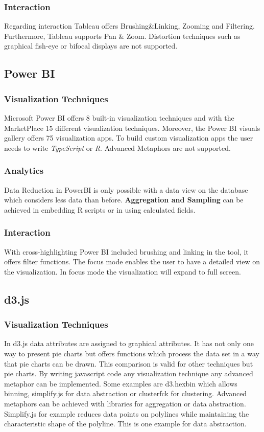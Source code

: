 \subsubsection*{Interaction}
Regarding interaction Tableau offers Brushing&Linking, Zooming and Filtering. Furthermore, Tableau supports Pan & Zoom. 
Distortion techniques such as graphical fish-eye or bifocal displays are not supported. 

\subsection*{Power BI}

\subsubsection*{Visualization Techniques}
Microsoft Power BI offers 8 built-in visualization techniques and with the MarketPlace 15 different visualization techniques. Moreover, the Power BI visuals gallery offers 75 visualization apps. To build custom visualization apps the user needs to write \textit{TypeScript} or \textit{R}. Advanced Metaphors are not supported. 

\subsubsection*{Analytics}
Data Reduction in PowerBI is only possible with a data view on the database which considers less data than before. 
\textbf{Aggregation and Sampling} can be achieved in embedding R scripts or in using calculated fields.
\subsubsection*{Interaction}
With cross-highlighting Power BI included brushing and linking in the tool\cite{powerbiInteract}, it offers filter functions. The focus mode enables the user to have a detailed view on the visualization. In focus mode the visualization will expand to full screen.  

\subsection*{d3.js}
\subsubsection*{Visualization Techniques}
In d3.js data attributes are assigned to graphical attributes. It has not only one way to present pie charts but offers functions which process the data set in a way that pie charts can be drawn. This comparison is valid for other techniques but pie charts. By writing javascript code any visualization technique any advanced metaphor can be implemented. Some examples are d3.hexbin which allows binning,  simplify.js for data abstraction or clusterfck for clustering.  
Advanced metaphors can be achieved with libraries for aggregation or data abstraction. Simplify.js for example reduces data points on polylines while maintaining the characteristic shape of the polyline. This is one example for data abstraction.

